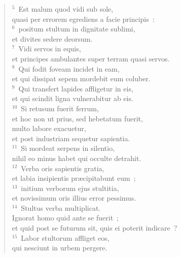 \begin{flushleft}\begin{verse}${}^{5}$~Est malum quod vidi sub sole,\\ quasi per errorem egrediens a facie principis~:\\
${}^{6}$~positum stultum in dignitate sublimi,\\ et divites sedere deorsum.\\
${}^{7}$~Vidi servos in equis,\\ et principes ambulantes super terram quasi servos.\\
${}^{8}$~Qui fodit foveam incidet in eam,\\ et qui dissipat sepem mordebit eum coluber.\\
${}^{9}$~Qui transfert lapides affligetur in eis,\\ et qui scindit ligna vulnerabitur ab eis.\\
${}^{10}$~Si retusum fuerit ferrum,\\ et hoc non ut prius, sed hebetatum fuerit,\\ multo labore exacuetur,\\ et post industriam sequetur sapientia.\\
${}^{11}$~Si mordeat serpens in silentio,\\ nihil eo minus habet qui occulte detrahit.\\
${}^{12}$~Verba oris sapientis gratia,\\ et labia insipientis pr\ae cipitabunt eum~;\\
${}^{13}$~initium verborum ejus stultitia,\\ et novissimum oris illius error pessimus.\\
${}^{14}$~Stultus verba multiplicat.\\ Ignorat homo quid ante se fuerit~;\\ et quid post se futurum sit, quis ei poterit indicare~?\\
${}^{15}$~Labor stultorum affliget eos,\\ qui nesciunt in urbem pergere.\end{verse}\end{flushleft}


